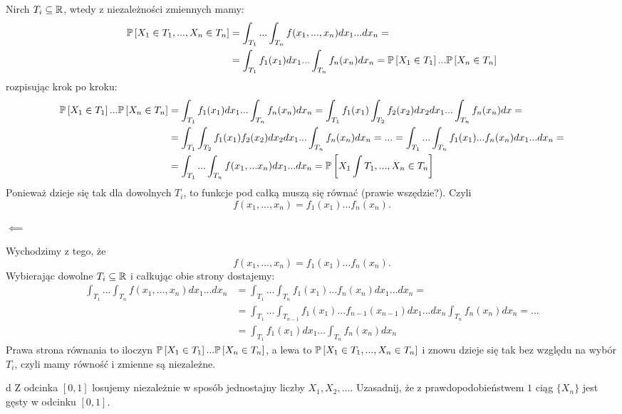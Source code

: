 \documentclass{article}
\begin{document}
Nirch $T_i\subseteq\mathbb{R}$, wtedy z niezależności zmiennych mamy:
\begin{align*}
    \prob{X_1\in T_1,...,X_n\in T_n}&=\int_{T_1}...\int_{T_n}f(x_1,...,x_n)dx_1...dx_n=\\
    &=\int_{T_1}f_1(x_1)dx_1...\int_{T_n}f_n(x_n)dx_n=\prob{X_1\in T_1}...\prob{X_n\in T_n}
\end{align*}
rozpisując krok po kroku:
\begin{align*}
    \prob{X_1\in T_1}...\prob{X_n\in T_n}&=\int_{T_1}f_1(x_1)dx_1...\int_{T_n}f_n(x_n)dx_n=\int_{T_1}f_1(x_1)\int_{T_2}f_2(x_2)dx_2dx_1...\int_{T_n}f_n(x_n)dx=\\
    &=\int_{T_1}\int_{T_2}f_1(x_1)f_2(x_2)dx_2dx_1...\int_{T_n}f_n(x_n)dx_n=...=\int_{T_1}...\int_{T_n}f_1(x_1)...f_n(x_n)dx_1...dx_n=\\
    &=\int_{T_1}...\int_{T_n}f(x_1,...x_n)dx_1...dx_n=\prob{X_1\int T_1,...,X_n\in T_n}
\end{align*}
Ponieważ dzieje się tak dla dowolnych $T_i$, to funkcje pod całką muszą się równać (prawie wszędzie?). Czyli
$$f(x_1,...,x_n)=f_1(x_1)...f_n(x_n).$$

$\impliedby$

Wychodzimy z tego, że
$$f(x_1,...,x_n)=f_1(x_1)...f_n(x_n).$$
Wybierając dowolne $T_i\subseteq\mathbb{R}$ i całkując obie strony dostajemy:
\begin{align*}
\int_{T_1}...\int_{T_n}f(x_1,...,x_n)dx_1...dx_n&=\int_{T_1}...\int_{T_n}f_1(x_1)...f_n(x_n)dx_1...dx_n=\\
&=\int_{T_1}...\int_{T_{n-1}}f_1(x_1)...f_{n-1}(x_{n-1})dx_1...dx_n\int_{T_n}f_n(x_n)dx_n=...\\
&=\int_{T_1}f_1(x_1)dx_1...\int_{T_n}f_n(x_n)dx_n
\end{align*}
Prawa strona równania to iloczyn $\prob{X_1\in T_1}...\prob{X_n\in T_n}$, a lewa to $\prob{X_1\in T_1,...,X_n\in T_n}$ i znowu dzieje się tak bez względu na wybór $T_i$, czyli mamy równość i zmienne są niezależne.

\begin{problem}[8]{d}
Z odcinka $[0,1]$ losujemy niezależnie w sposób jednostajny liczby $X_1,X_2,...$. Uzasadnij, że z prawdopodobieństwem $1$ ciąg $\{X_n\}$ jest gęsty w odcinku $[0,1]$.
\end{problem}
\end{document}
